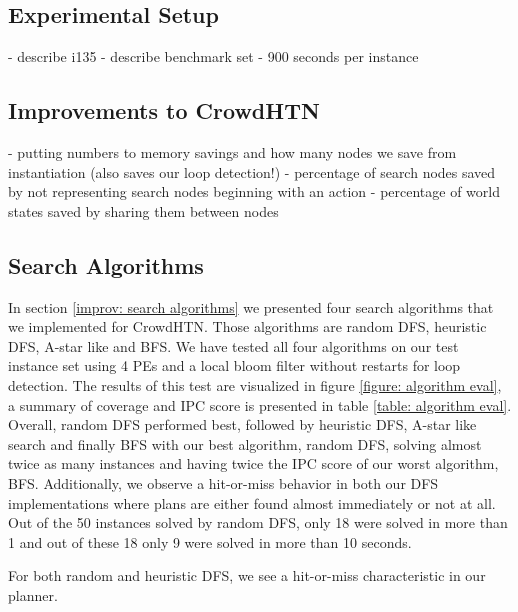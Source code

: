 \subsection{Experimental Setup}
- describe i135
- describe benchmark set
- 900 seconds per instance

\subsection{Improvements to CrowdHTN}
- putting numbers to memory savings and how many nodes we save from instantiation (also saves our loop detection!)
- percentage of search nodes saved by not representing search nodes beginning with an action
- percentage of world states saved by sharing them between nodes

\subsection{Search Algorithms}
In section \ref{improv: search algorithms} we presented four search algorithms that we implemented for CrowdHTN. Those algorithms are random DFS, heuristic DFS, A-star like and BFS. We have tested all four algorithms on our test instance set using 4 PEs and a local bloom filter without restarts for loop detection. The results of this test are visualized in figure \ref{figure: algorithm eval}, a summary of coverage and IPC score is presented in table \ref{table: algorithm eval}. \\
Overall, random DFS performed best, followed by heuristic DFS, A-star like search and finally BFS with our best algorithm, random DFS, solving almost twice as many instances and having twice the IPC score of our worst algorithm, BFS. Additionally, we observe a hit-or-miss behavior in both our DFS implementations where plans are either found almost immediately or not at all. Out of the 50 instances solved by random DFS, only 18 were solved in more than 1 and out of these 18 only 9 were solved in more than 10 seconds. 

For both random and heuristic DFS, we see a hit-or-miss characteristic in our planner.

